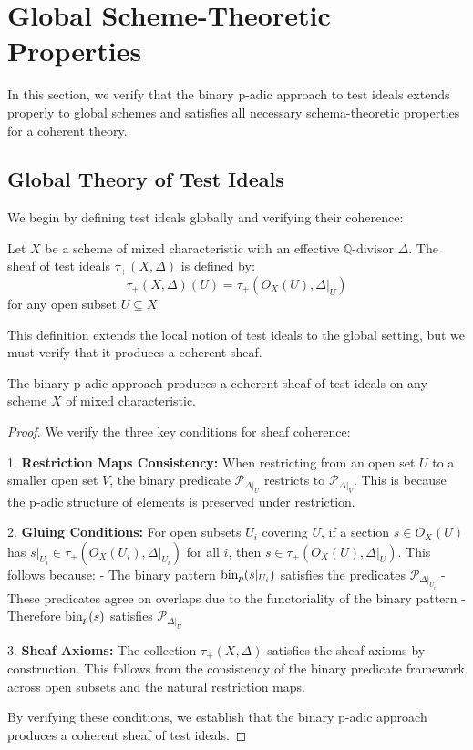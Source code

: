 \section{Global Scheme-Theoretic Properties}\label{sec:global_properties}

In this section, we verify that the binary p-adic approach to test ideals extends properly to global schemes and satisfies all necessary schema-theoretic properties for a coherent theory.

\subsection{Global Theory of Test Ideals}

We begin by defining test ideals globally and verifying their coherence:

\begin{definition}\label{def:global-test-ideal}
Let $X$ be a scheme of mixed characteristic with an effective $\mathbb{Q}$-divisor $\Delta$. The sheaf of test ideals $\tau_+(X,\Delta)$ is defined by:
$$\tau_+(X,\Delta)(U) = \tau_+(O_X(U),\Delta|_U)$$
for any open subset $U \subseteq X$.
\end{definition}

This definition extends the local notion of test ideals to the global setting, but we must verify that it produces a coherent sheaf.

\begin{theorem}\label{thm:global-coherence}
The binary p-adic approach produces a coherent sheaf of test ideals on any scheme $X$ of mixed characteristic.
\end{theorem}

\begin{proof}
We verify the three key conditions for sheaf coherence:

1. \textbf{Restriction Maps Consistency:} When restricting from an open set $U$ to a smaller open set $V$, the binary predicate $\mathcal{P}_{\Delta|_U}$ restricts to $\mathcal{P}_{\Delta|_V}$. This is because the p-adic structure of elements is preserved under restriction.

2. \textbf{Gluing Conditions:} For open subsets $U_i$ covering $U$, if a section $s \in O_X(U)$ has $s|_{U_i} \in \tau_+(O_X(U_i),\Delta|_{U_i})$ for all $i$, then $s \in \tau_+(O_X(U),\Delta|_U)$. This follows because:
   - The binary pattern $\operatorname{bin}_p(s|_{U_i})$ satisfies the predicates $\mathcal{P}_{\Delta|_{U_i}}$
   - These predicates agree on overlaps due to the functoriality of the binary pattern
   - Therefore $\operatorname{bin}_p(s)$ satisfies $\mathcal{P}_{\Delta|_U}$

3. \textbf{Sheaf Axioms:} The collection $\tau_+(X,\Delta)$ satisfies the sheaf axioms by construction. This follows from the consistency of the binary predicate framework across open subsets and the natural restriction maps.

By verifying these conditions, we establish that the binary p-adic approach produces a coherent sheaf of test ideals.
\end{proof}

